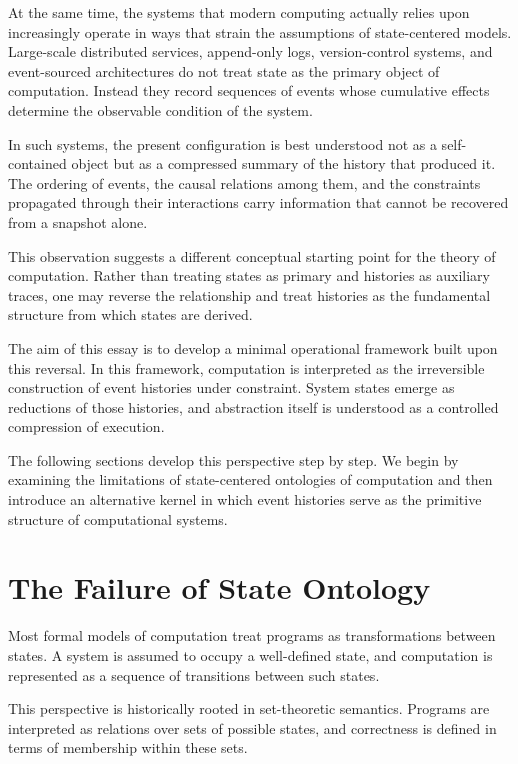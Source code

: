 \documentclass[12pt]{article}
\begin{document}
At the same time, the systems that modern computing
actually relies upon increasingly operate in ways that
strain the assumptions of state-centered models.
Large-scale distributed services, append-only logs,
version-control systems, and event-sourced architectures
do not treat state as the primary object of computation.
Instead they record sequences of events whose cumulative
effects determine the observable condition of the system.

In such systems, the present configuration is best understood
not as a self-contained object but as a compressed summary
of the history that produced it. The ordering of events,
the causal relations among them, and the constraints
propagated through their interactions carry information
that cannot be recovered from a snapshot alone.

This observation suggests a different conceptual starting
point for the theory of computation. Rather than treating
states as primary and histories as auxiliary traces,
one may reverse the relationship and treat histories
as the fundamental structure from which states are derived.

The aim of this essay is to develop a minimal operational
framework built upon this reversal. In this framework,
computation is interpreted as the irreversible construction
of event histories under constraint. System states emerge
as reductions of those histories, and abstraction itself
is understood as a controlled compression of execution.

The following sections develop this perspective step by step.
We begin by examining the limitations of state-centered
ontologies of computation and then introduce an alternative
kernel in which event histories serve as the primitive
structure of computational systems.


\section{The Failure of State Ontology}

Most formal models of computation treat programs as transformations
between states. A system is assumed to occupy a well-defined state,
and computation is represented as a sequence of transitions between
such states.

This perspective is historically rooted in set-theoretic semantics.
Programs are interpreted as relations over sets of possible states,
and correctness is defined in terms of membership within these sets.
\end{document}
